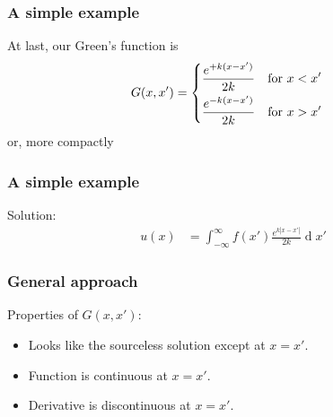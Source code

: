 \documentclass[12 pt, compress, handout, intlimits]{beamer}
\renewcommand{\d}{\operatorname{d}}
\newcommand*\widefbox[1]{\fbox{\hspace{1em}#1\hspace{1em}}}
\begin{document}

\begin{frame}[fragile]
    \frametitle{A simple example}
    At last, our Green's function is
    \begin{align*}
        G(x,x') &= 
        \begin{dcases} 
            \dfrac{e^{+k (x - x')}}{2k} & \text{for } x < x'
            \\
            \dfrac{e^{-k (x - x')}}{2k} & \text{for } x > x'
        \end{dcases}
    \end{align*}
    or, more compactly
    

\end{frame}

\note{
}

\begin{frame}[fragile]
    \frametitle{A simple example}
    Solution:
    \begin{align*}
        u(x) &= \int_{-\infty}^{\infty} f(x') \frac{e^{k|x - x'|}}{2k} \d x'
    \end{align*}
    
\end{frame}


\begin{frame}[fragile]
    \frametitle{General approach}
    Properties of $ G(x,x') $:
    \begin{itemize}
    \item
        Looks like the sourceless solution except at $ x = x' $.
    \item
        Function is continuous at $ x = x' $.
    \item
        Derivative is discontinuous at $ x = x' $.
    \end{itemize}
    
\end{frame}
\end{document}

